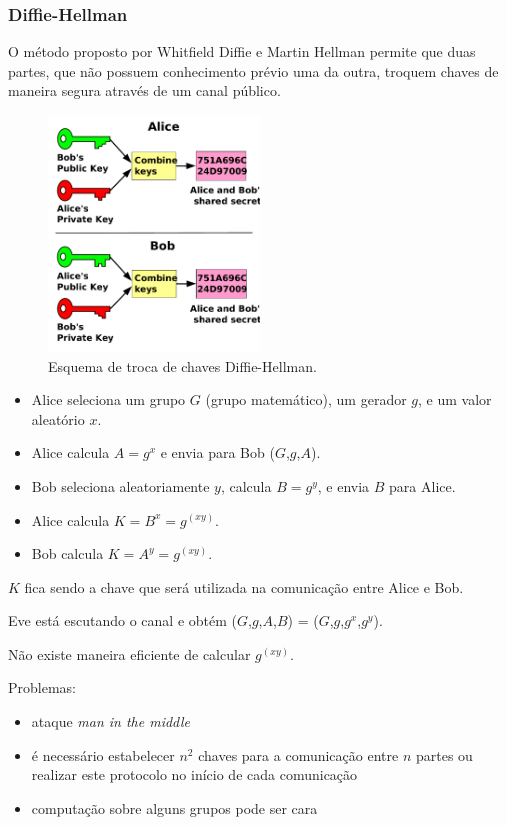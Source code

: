 \begin{frame}[allowframebreaks]
\frametitle{Diffie-Hellman}
O método proposto por Whitfield Diffie e Martin Hellman permite que duas partes,
que não possuem conhecimento prévio uma da outra, troquem chaves de maneira segura através de um canal público.

\begin{figure}[h]
\centering
\includegraphics[width=0.5\textwidth,height=0.5\textheight,keepaspectratio]{figures/public_key_shared_secret.pdf}
\caption{Esquema de troca de chaves Diffie-Hellman.}
\label{fig-diffiehellman}
\end{figure}

\framebreak
\begin{itemize}
\item Alice seleciona um grupo $G$ (grupo matemático), um gerador $g$, e um valor aleatório $x$.
\item Alice calcula $A = g^x$ e envia para Bob ($G$,$g$,$A$).
\item Bob seleciona aleatoriamente $y$, calcula $B = g^y$, e envia $B$ para Alice.
\item Alice calcula $K = B^x= g^{(xy)}$.
\item Bob calcula $K = A^y= g^{(xy)}$.
\end{itemize}

$K$ fica sendo a chave que será utilizada na comunicação entre Alice e Bob.

Eve está escutando o canal e obtém ($G$,$g$,$A$,$B$) = ($G$,$g$,$g^x$,$g^y$).

Não existe maneira eficiente de calcular $g^{(xy)}$.

\framebreak
Problemas:
\begin{itemize}
\item ataque \emph{man in the middle}
\item é necessário estabelecer $n^2$ chaves para a comunicação entre $n$ partes ou realizar este protocolo no início de cada comunicação
\item computação sobre alguns grupos pode ser cara
\end{itemize}

\end{frame}


